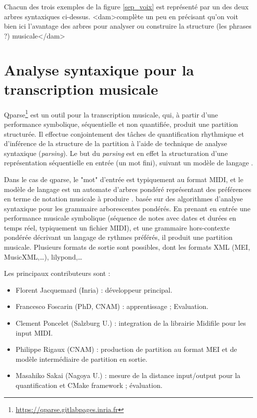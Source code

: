 Chacun des trois exemples de la figure \ref{sep_voix} est représenté par un des
deux arbres syntaxiques ci-dessus.
<dam>complète un peu en précisant qu'on voit bien ici l'avantage des arbres
pour analyser ou construire la structure (les phrases ?) musicale</dam>

\section{Analyse syntaxique pour la transcription musicale}
Qparse\footnote{\url{https://qparse.gitlabpages.inria.fr}} est un outil pour la
transcription musicale, qui, à partir d'une performance symbolique,
séquentielle et non quantifiée, produit une partition structurée. Il effectue
conjointement des tâches de quantification rhythmique et d'inférence de la
structure de la partition à l'aide de technique de analyse syntaxique
(\textit{parsing}). Le but du \textit{parsing} est en effet la structuration
d'une représentation séquentielle en entrée (un mot fini), suivant un modèle de
langage \cite{grune2007parsing}.

Dans le cas de qparse, le "mot" d'entrée est typiquement au format MIDI, et le
modèle de langage est un automate d'arbres pondéré représentant des préférences
en terme de notation musicale à produire \cite{droste2009handbook}.
basée sur des algorithmes d'analyse syntaxique pour les grammaire arborescentes
pondérés. En prenant en entrée une performance musicale symbolique (séquence de
notes avec dates et durées en temps réel, typiquement un fichier MIDI), et une
grammaire hors-contexte pondérée décrivant un langage de rythmes préférés, il
produit une partition musicale. Plusieurs formats de sortie sont possibles,
dont les formats XML (MEI, MusicXML,…), lilypond,…

Les principaux contributeurs sont :
\begin{itemize}
	\item Florent Jacquemard (Inria) : développeur principal.
	\item Francesco Foscarin (PhD, CNAM) : apprentissage ; Evaluation.
	\item Clement Poncelet (Salzburg U.) : integration de la librairie Midifile
        pour les input MIDI.
	\item Philippe Rigaux (CNAM) : production de partition au format MEI et de
        modèle intermédiaire de partition en sortie.
	\item Masahiko Sakai (Nagoya U.) : mesure de la distance input/output pour
        la quantification et CMake framework ; évaluation.
\end{itemize}\newpage

